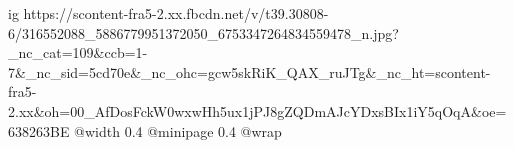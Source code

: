  
 
 
 
 

\ifcmt
  ig https://scontent-fra5-2.xx.fbcdn.net/v/t39.30808-6/316552088_5886779951372050_6753347264834559478_n.jpg?_nc_cat=109&ccb=1-7&_nc_sid=5cd70e&_nc_ohc=gcw5skRiK_QAX_ruJTg&_nc_ht=scontent-fra5-2.xx&oh=00_AfDosFckW0wxwHh5ux1jPJ8gZQDmAJcYDxsBIx1iY5qOqA&oe=638263BE
  @width 0.4
  @minipage 0.4
  @wrap \parpic[r]
\fi
